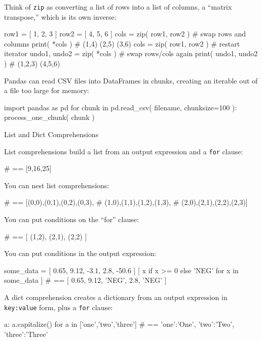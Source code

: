 \documentclass[a4paper,landscape,columns=3]{cheatsheet}
\def\sect#1{\begin{tcolorbox}[colback=blue!5!white,colframe=blue!75!black,size=title,leftrule=2mm]
    \large #1
\end{tcolorbox}}
\begin{document}
Think of \lstinline{zip} as converting a list of rows into a list of columns, a ``matrix transpose,'' which is its own inverse:
\begin{python}
row1 = [ 1, 2, 3 ]
row2 = [ 4, 5, 6 ]
cols = zip( row1, row2 )     # swap rows and columns
print( *cols )               # (1,4) (2,5) (3,6)
cols = zip( row1, row2 )     # restart iterator
undo1, undo2 = zip( *cols )  # swap rows/cols again
print( undo1, undo2 )        # (1,2,3) (4,5,6)
\end{python}

Pandas can read CSV files into DataFrames in chunks, creating an iterable out of a file too large for memory:
\begin{python}
import pandas as pd
for chunk in pd.read_csv( filename, chunksize=100 ):
    process_one_chunk( chunk )
\end{python}

\sect{List and Dict Comprehensions}

List comprehensions build a list from an output expression and a \lstinline{for} clause:
\begin{python}
      # == [9,16,25]
\end{python}

You can nest list comprehensions:
\begin{python}
  # == [(0,0),(0,1),(0,2),(0,3),
  #     (1,0),(1,1),(1,2),(1,3),
  #     (2,0),(2,1),(2,2),(2,3)]
\end{python}

You can put conditions on the ``for'' clause:
\begin{python}
  # == [ (1,2), (2,1), (2,2) ]
\end{python}

You can put conditions in the output expression:
\begin{python}
some_data = [ 0.65, 9.12, -3.1, 2.8, -50.6 ]
[ x if x >= 0 else 'NEG' for x in some_data ]
  # == [ 0.65, 9.12, 'NEG', 2.8, 'NEG' ]
\end{python}

A dict comprehension creates a dictionary from an output expression in \lstinline{key:value} form, plus a \lstinline{for} clause:
\begin{python}
{ a: a.capitalize() for a in ['one','two','three'] }
  # == { 'one':'One', 'two':'Two', 'three':'Three' }
\end{python}
\end{document}
